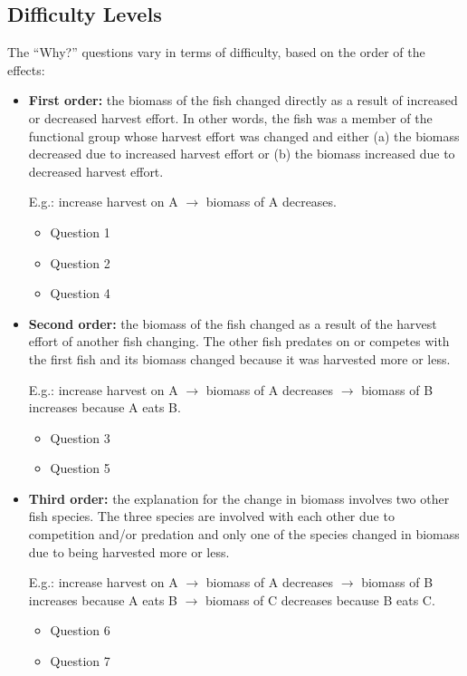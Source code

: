 \subsection{Difficulty Levels}

The ``Why?'' questions vary in terms of difficulty, based on the order of the effects:

\begin{itemize}
\item \textbf{First order:} the biomass of the fish changed directly as a result of increased or decreased harvest effort.  In other words, the fish was a member of the functional group whose harvest effort was changed and either (a) the biomass decreased due to increased harvest effort or (b) the biomass increased due to decreased harvest effort.

E.g.: increase harvest on A $\rightarrow$ biomass of A decreases.
\begin{itemize}
\item Question 1
\item Question 2
\item Question 4
\end{itemize}
\item \textbf{Second order:} the biomass of the fish changed as a result of the harvest effort of another fish changing.  The other fish predates on or competes with the first fish and its biomass changed because it was harvested more or less.

E.g.: increase harvest on A $\rightarrow$ biomass of A decreases $\rightarrow$ biomass of B increases because A eats B.
\begin{itemize}
\item Question 3
\item Question 5
\end{itemize}
\item \textbf{Third order:} the explanation for the change in biomass involves two other fish species.  The three species are involved with each other due to competition and/or predation and only one of the species changed in biomass due to being harvested more or less.

E.g.: increase harvest on A $\rightarrow$ biomass of A decreases $\rightarrow$ biomass of B increases because A eats B $\rightarrow$ biomass of C decreases because B eats C.
\begin{itemize}
\item Question 6
\item Question 7
\end{itemize}
\end{itemize}